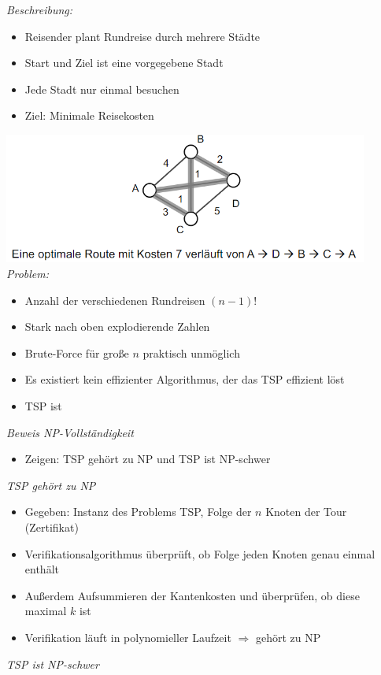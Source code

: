 \documentclass[
    ngerman,
    color=3b,
    dark_mode,
    load_common, %
    summary,
    boxarc,
]{tuda_summary}
\begin{document}
\textit{Beschreibung:}
\begin{itemize}
      \item Reisender plant Rundreise durch mehrere Städte
      \item Start und Ziel ist eine vorgegebene Stadt
      \item Jede Stadt nur einmal besuchen
      \item Ziel: Minimale Reisekosten
\end{itemize}
\includegraphics[width=12cm]{pictures/tsp1.PNG}\\
\textit{Problem:}
\begin{itemize}
      \item Anzahl der verschiedenen Rundreisen $(n-1)!$
      \item Stark nach oben explodierende Zahlen
      \item Brute-Force für gro\ss{}e $n$ praktisch unmöglich
      \item Es existiert kein effizienter Algorithmus, der das TSP effizient löst
      \item TSP ist 
\end{itemize}
\textit{Beweis NP-Vollständigkeit}
\begin{itemize}
      \item Zeigen: TSP gehört zu NP und TSP ist NP-schwer
\end{itemize}
\textit{TSP gehört zu NP}
\begin{itemize}
      \item Gegeben: Instanz des Problems TSP, Folge der $n$ Knoten der Tour (Zertifikat)
      \item Verifikationsalgorithmus überprüft, ob Folge jeden Knoten genau einmal enthält
      \item Au\ss{}erdem Aufsummieren der Kantenkosten und überprüfen, ob diese maximal $k$ ist
      \item Verifikation läuft in polynomieller Laufzeit $\Rightarrow$ gehört zu NP
\end{itemize}
\clearpage
\textit{TSP ist NP-schwer}
\end{document}
